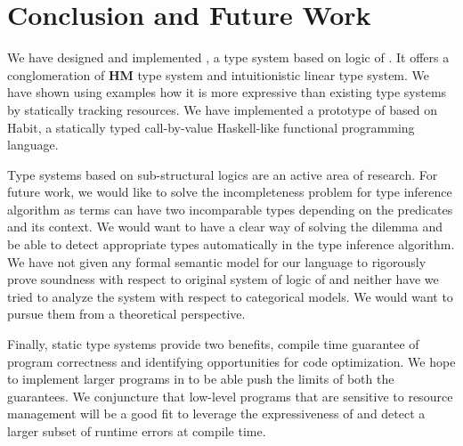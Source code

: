 \chapter{Conclusion and Future Work}\label{chp:conclusion}

We have designed and implemented \qub{}, a type system based on logic of \BI{}.
It offers a conglomeration of \textbf{HM} type system and intuitionistic linear type system. We have shown
using examples how it is more expressive than existing type systems by statically tracking resources.
We have implemented a prototype of \qub{}\citep{apoorv_qub_2018} based on Habit\citep{diatchki_thesis_2007,morris_thesis_2013},
a statically typed call-by-value Haskell-like functional programming language.

Type systems based on sub-structural logics are an active area of research. For future work,
we would like to solve the incompleteness problem for \qub{} type inference algorithm as terms can have two incomparable types depending
on the predicates and its context. We would want to have a clear way of solving
the dilemma and be able to detect appropriate types automatically in the type inference algorithm.
We have not given any formal semantic model for our language to rigorously prove soundness with respect to original
system of logic of \BI{} and neither have we tried to analyze the system with respect to categorical models.
We would want to pursue them from a theoretical perspective.

Finally, static type systems provide two benefits, compile time guarantee of program correctness and identifying opportunities
for code optimization. We hope to implement larger programs in \qub{} to be able push the limits of both the guarantees.
We conjuncture that low-level programs that are sensitive to resource management will be a good fit to leverage the expressiveness of \qub{}
and detect a larger subset of runtime errors at compile time.